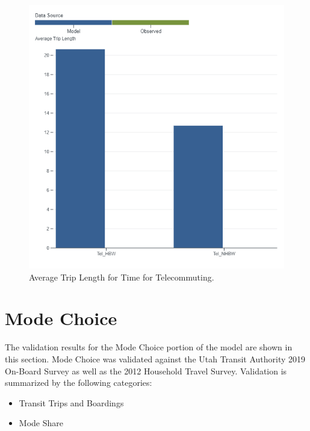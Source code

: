 \documentclass[
  letterpaper,
  DIV=11,
  numbers=noendperiod]{scrreprt}
\providecommand{\tightlist}{%
  \setlength{\itemsep}{0pt}\setlength{\parskip}{0pt}}\usepackage{longtable,booktabs,array}
\begin{document}
\begin{figure}[H]

{\centering \includegraphics[width=\textwidth,height=0.4\textheight]{v9x/v900/validation/_pictures/5-plot9.png}

}

\caption{\label{fig-pdf-time-tele}Average Trip Length for Time for
Telecommuting.}

\end{figure}


\hypertarget{mode-choice}{%
\chapter{Mode Choice}\label{mode-choice}}

The validation results for the Mode Choice portion of the model are
shown in this section. Mode Choice was validated against the Utah
Transit Authority 2019 On-Board Survey as well as the 2012 Household
Travel Survey. Validation is summarized by the following categories:

\begin{itemize}
\tightlist
\item
  Transit Trips and Boardings
\item
  Mode Share
\end{itemize}
\end{document}
